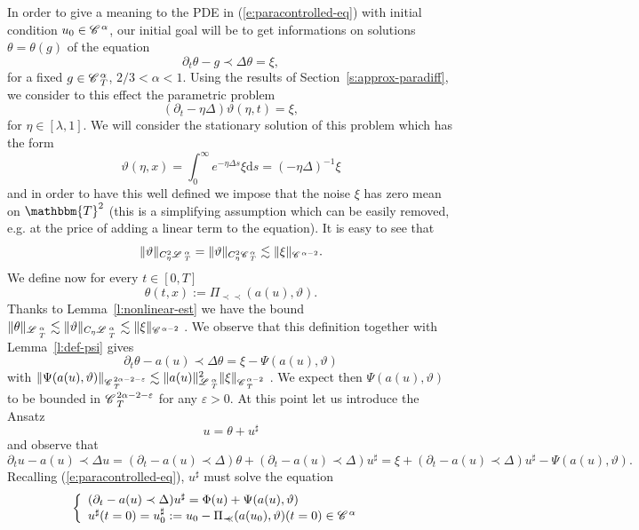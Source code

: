 \documentclass[11pt,reqno]{amsart}
\newcommand{\assign}{:=}
\newcommand{\mathd}{\mathrm{d}}
\newcommand{\precprec}{\prec\!\!\!\prec}
\newcommand{\CC}{\mathscr{C} \hspace{.1em}}
\newcommand{\LL}{\mathscr{L} \hspace{.2em}}
\begin{document}
In order to give a meaning to the PDE in (\ref{e:paracontrolled-eq}) with
initial condition $u_0 \in \CC^{\alpha}$, our initial goal will be to get
informations on solutions $\theta = \theta (g)$ of the equation
\[ \partial_t \theta - g \prec \Delta \theta = \xi, \]
for a fixed $g \in \CC^{\alpha}_T$, $2 / 3 < \alpha < 1$. Using the results of
Section~\ref{s:approx-paradiff}, we consider to this effect the parametric
problem
\[ (\partial_t - \eta \Delta) \vartheta (\eta, t) = \xi, \]
for $\eta \in [\lambda, 1]$. We will consider the stationary solution of this
problem which has the form
\begin{equation}
  \vartheta (\eta, x) = \int_0^{\infty} e^{- \eta \Delta s} \xi \mathd s = (-
  \eta \Delta)^{- 1} \xi \label{eq:def-theta}
\end{equation}
and in order to have this well defined we impose that the noise $\xi$ has zero
mean on $\mathbbm{T}^2$ (this is a simplifying assumption which can be easily
removed, e.g. at the price of adding a linear term to the equation). It is
easy to see that
\begin{equation}
  \| \vartheta \|_{C_{\eta}^2 \LL^{\alpha}_T} = \| \vartheta \|_{C_{\eta}^2
  \CC^{\alpha}_T} \lesssim \| \xi \|_{\CC^{\alpha - 2}} .
  \label{eq:vartheta-est} 
\end{equation}
We define now for every $t \in [0, T]$
\[ \theta (t, x) \assign \Pi_{\precprec} (a (u), \vartheta) . \]
Thanks to Lemma~\ref{l:nonlinear-est} we have the bound $\| \theta
\|_{\LL^{\alpha}_{_T}} \lesssim \| \vartheta \|_{C_{\eta} \LL^{\alpha}_{_T}}
\lesssim \| \xi \|_{\CC^{\alpha - 2}}$ . We observe that this definition
together with Lemma~\ref{l:def-psi} gives
\[ \partial_t \theta - a (u) \prec \Delta \theta = \xi - \Psi (a (u),
   \vartheta) \]
with $\| \Psi (a (u), \vartheta) \|_{\CC^{2 \alpha - 2 - \varepsilon}_T}
\lesssim \| a (u) \|^2_{\LL^{\alpha}_T} \| \xi \|_{\CC^{\alpha - 2}_T}$ . We
expect then $\Psi (a (u), \vartheta)$ to be bounded in $\CC^{2 \alpha - 2 -
\varepsilon}_T$ for any $\varepsilon > 0$. At this point let us introduce the
Ansatz
\begin{equation}
  u = \theta + u^{\sharp}  \label{e:firstansatz}
\end{equation}
and observe that
\[ \partial_t u - a (u) \prec \Delta u = (\partial_t - a (u) \prec \Delta)
   \theta + (\partial_t - a (u) \prec \Delta) u^{\sharp} = \xi + (\partial_t -
   a (u) \prec \Delta) u^{\sharp} - \Psi (a (u), \vartheta) . \]
Recalling (\ref{e:paracontrolled-eq}), $u^{\sharp}$ must solve the equation
\begin{equation}
  \left\{ \begin{array}{l}
    (\partial_t - a (u) \prec \Delta) u^{\sharp} = \Phi (u) + \Psi (a (u),
    \vartheta)\\
    u^{\sharp} (t = 0) = u^{\sharp}_0 \assign u_0 - \Pi_{\precprec} (a (u_0),
    \vartheta) (t = 0) \in \CC^{\alpha}
  \end{array} \right. \label{e:usharp-equadiff} \qquad
\end{equation}
\end{document}
